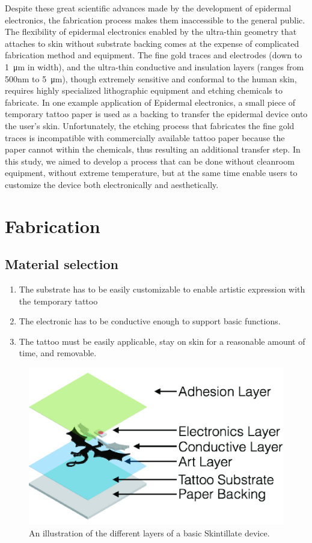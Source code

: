 \documentclass{sigchi}
\begin{document}
Despite these great scientific advances made by the development of epidermal electronics, the fabrication process makes them inaccessible to the general public. The flexibility of epidermal electronics enabled by the ultra-thin geometry that attaches to skin without substrate backing comes at the expense of complicated fabrication method and equipment. The fine gold traces and electrodes (down to \SI{1}{\micro\metre} in width), and the ultra-thin conductive and insulation layers (ranges from 500nm to 5\SI{}{\micro\metre}), though extremely sensitive and conformal to the human skin, requires highly specialized lithographic equipment and etching chemicals to fabricate. In one example application of Epidermal electronics, a small piece of temporary tattoo paper is used as a backing to transfer the epidermal device onto the user's skin. Unfortunately, the etching process that fabricates the fine gold traces is incompatible with commercially available tattoo paper because the paper cannot within the chemicals, thus resulting an additional transfer step. In this study, we aimed to develop a process that can be done without cleanroom equipment, without extreme temperature, but at the same time enable users to customize the device both electronically and aesthetically. 

\section{Fabrication}
\subsection{Material selection}
\begin{enumerate}
  \item The substrate has to be easily customizable to enable artistic expression with the temporary tattoo
  \item The electronic has to be conductive enough to support basic functions. 
  \item The tattoo must be easily applicable, stay on skin for a reasonable amount of time, and removable.
\end{enumerate}
\begin{figure}[!h]
\centering
\includegraphics[width=0.9\columnwidth]{figures/Figure3}
\caption{An illustration of the different layers of a basic Skintillate device.}
\label{fig:figure3}
\end{figure}
\end{document}
